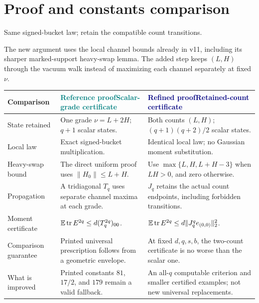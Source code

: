 \documentclass[11pt]{article}
\numberwithin{equation}{section}
\theoremstyle{definition}\newtheorem{definition}[theorem]{Definition}
\theoremstyle{remark}\newtheorem{remark}[theorem]{Remark}
\newcommand{\tr}{\operatorname{tr}}\newcommand{\Ent}{\operatorname{Ent}}
\begin{document}
\section*{Proof and constants comparison}
{\sffamily\color{Teal}\large Same signed-bucket law; retain the compatible count transitions.\par}
\vspace{2mm}
The new argument uses the local channel bounds already in v11, including its
sharper marked-support heavy-swap lemma. The added step keeps $(L,H)$ through
the vacuum walk instead of maximizing each channel separately at fixed $\nu$.

\vspace{2mm}
\begingroup
\fontsize{9.5}{11.7}\selectfont
\setlength{\tabcolsep}{4pt}\renewcommand{\arraystretch}{1.16}
\begin{tabularx}{\textwidth}{@{}P{.24\textwidth}YY@{}}
\toprule
\textbf{Comparison} &
\textcolor{Teal}{\textbf{Reference proof}}\newline \textcolor{Teal}{Scalar-grade certificate} &
\textcolor{Navy}{\textbf{Refined proof}}\newline \textcolor{Navy}{Retained-count certificate}\\
\midrule
{}
State retained & One grade $\nu=L+2H$; $q+1$ scalar states. &
Both counts $(L,H)$; $(q+1)(q+2)/2$ scalar states.\\[3pt]
Local law & Exact signed-bucket multiplication. &
Identical local law; no Gaussian moment substitution.\\[3pt]
Heavy-swap bound & The direct uniform proof uses $\|H_0\|\le L+H$. &
Use $\max\{L,H,L+H-3\}$ when $LH>0$, and zero otherwise.\\[3pt]
Propagation & A tridiagonal $T_q$ uses separate channel maxima at each grade. &
$J_q$ retains the actual count endpoints, including forbidden transitions.\\[3pt]
Moment certificate & $\E\tr E^{2q}\le d(T_q^{2q})_{00}$. &
$\E\tr E^{2q}\le d\|J_q^q e_{(0,0)}\|_2^2$.\\[3pt]
Comparison guarantee & Printed universal prescription follows from a geometric envelope. &
At fixed $d,q,s,b$, the two-count certificate is no worse than the scalar one.\\[3pt]
What is improved & Printed constants $81$, $17/2$, and $179$ remain a valid fallback. &
An all-$q$ computable criterion and smaller certified examples; not new universal replacements.\\[3pt]
\bottomrule
\end{tabularx}
\endgroup
\end{document}

